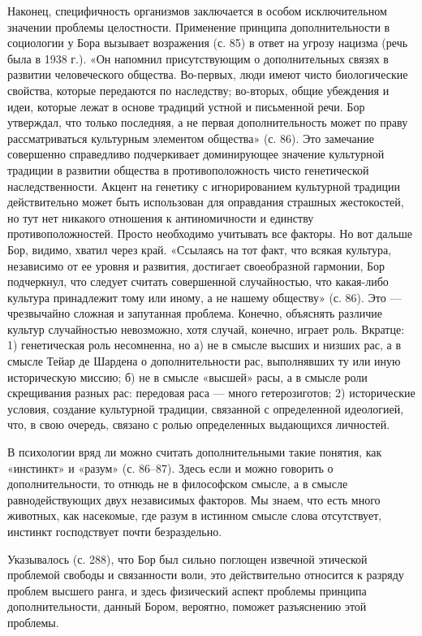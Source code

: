 Наконец, специфичность организмов  заключается в особом исключительном
значении проблемы целостности.  Применение принципа дополнительности в
социологии  у Бора  вызывает  возражения  (с. 85)  в  ответ на  угрозу
нацизма  (речь  была  в  1938   г.).  «Он  напомнил  присутствующим  о
дополнительных  связях в  развитии человеческого  общества. Во-первых,
люди  имеют  чисто  биологические   свойства,  которые  передаются  по
наследству;  во-вторых,  общие  убеждения  и  идеи,  которые  лежат  в
основе  традиций   устной  и  письменной  речи.   Бор  утверждал,  что
только  последняя,  а  не   первая  дополнительность  может  по  праву
рассматриваться культурным элементом общества»  (с. 86). Это замечание
совершенно справедливо  подчеркивает доминирующее  значение культурной
традиции в  развитии общества  в противоположность  чисто генетической
наследственности.  Акцент  на  генетику  с  игнорированием  культурной
традиции действительно может быть  использован для оправдания страшных
жестокостей, но тут нет никакого отношения к антиномичности и единству
противоположностей. Просто  необходимо учитывать  все факторы.  Но вот
дальше  Бор, видимо,  хватил через  край. «Ссылаясь  на тот  факт, что
всякая  культура,  независимо  от  ее  уровня  и  развития,  достигает
своеобразной гармонии, Бор подчеркнул, что следует считать совершенной
случайностью, что какая-либо культура принадлежит тому или иному, а не
нашему обществу»  (с. 86).  Это ---  чрезвычайно сложная  и запутанная
проблема. Конечно, объяснять различие культур случайностью невозможно,
хотя  случай,  конечно, играет  роль.  Вкратце:  1) генетическая  роль
несомненна, но а) не в смысле высших и низших рас, а в смысле Тейар де
Шардена о  дополнительности рас, выполнявших ту  или иную историческую
миссию; б)  не в  смысле «высшей»  расы, а  в смысле  роли скрещивания
разных рас:  передовая раса  --- много гетерозиготов;  2) исторические
условия,  создание  культурной   традиции,  связанной  с  определенной
идеологией,  что,  в  свою   очередь,  связано  с  ролью  определенных
выдающихся личностей.

В психологии вряд ли можно  считать дополнительными такие понятия, как
«инстинкт»  и «разум»  (с.  86--87).  Здесь если  и  можно говорить  о
дополнительности,  то  отнюдь не  в  философском  смысле, а  в  смысле
равнодействующих  двух  независимых  факторов.   Мы  знаем,  что  есть
много  животных, как  насекомые,  где разум  в  истинном смысле  слова
отсутствует, инстинкт господствует почти безраздельно.

Указывалось (с. 288),  что Бор был сильно  поглощен извечной этической
проблемой свободы  и связанности  воли, это действительно  относится к
разряду  проблем высшего  ранга,  и здесь  физический аспект  проблемы
принципа дополнительности, данный Бором, вероятно, поможет разъяснению
этой проблемы.

